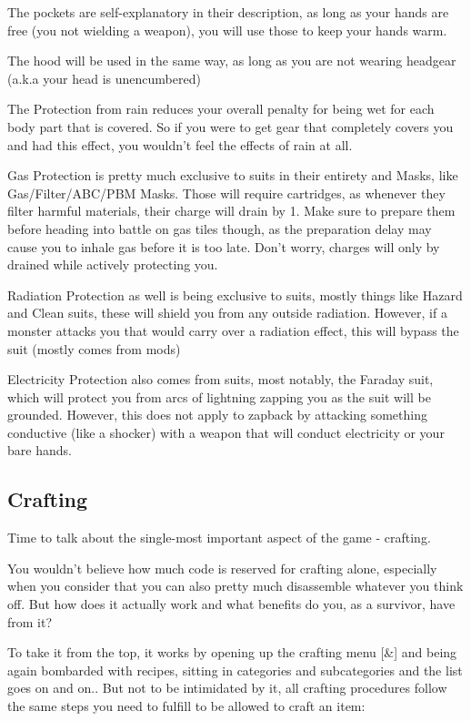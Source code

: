 The pockets are self-explanatory in their description, as long as your hands are free (you not wielding a weapon), you will use those to keep your hands warm.

The hood will be used in the same way, as long as you are not wearing headgear (a.k.a your head is unencumbered)

The Protection from rain reduces your overall penalty for being wet for each body part that is covered. So if you were to get gear that completely covers you and had this effect, you wouldn't feel the effects of rain at all.

Gas Protection is pretty much exclusive to suits in their entirety and Masks, like Gas/Filter/ABC/PBM Masks. Those will require cartridges, as whenever they filter harmful materials, their charge will drain by 1. Make sure to prepare them before heading into battle on gas tiles though, as the preparation delay may cause you to inhale gas before it is too late. Don't worry, charges will only by drained while actively protecting you.

Radiation Protection as well is being exclusive to suits, mostly things like Hazard and Clean suits, these will shield you from any outside radiation. However, if a monster attacks you that would carry over a radiation effect, this will bypass the suit (mostly comes from mods)

Electricity Protection also comes from suits, most notably, the Faraday suit, which will protect you from arcs of lightning zapping you as the suit will be grounded. However, this does not apply to zapback by attacking something conductive (like a shocker) with a weapon that will conduct electricity or your bare hands.

\subsection{Crafting}

Time to talk about the single-most important aspect of the game - crafting.

You wouldn't believe how much code is reserved for crafting alone, especially when you consider that you can also pretty much disassemble whatever you think off. But how does it actually work and what benefits do you, as a survivor, have from it?

To take it from the top, it works by opening up the crafting menu [\&] and being again bombarded with recipes, sitting in categories and subcategories and the list goes on and on.. But not to be intimidated by it, all crafting procedures follow the same steps you need to fulfill to be allowed to craft an item:

